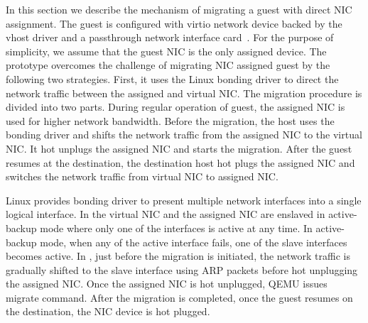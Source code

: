 In this section we describe the mechanism of migrating a guest with 
direct NIC assignment. The guest is configured with virtio network 
device backed by the vhost driver and a passthrough network interface 
card~\cite{zhai:2008}. For the purpose of simplicity, we assume that the 
guest NIC is the only assigned device. The prototype overcomes 
the challenge of migrating NIC assigned guest by the following
two strategies. First, it uses the Linux bonding driver to
direct the network traffic between the assigned and virtual
NIC. The migration procedure is divided into two parts. During regular operation 
of guest, the assigned NIC is used for higher network bandwidth. 
Before the migration, the host uses the bonding driver and shifts the
network traffic from the assigned NIC to the virtual NIC. It
hot unplugs the assigned NIC and starts the migration. After
the guest resumes at the destination, the destination host hot
plugs the assigned NIC and switches the network traffic
from virtual NIC to assigned NIC. 

%

Linux provides bonding driver to present multiple network interfaces
into a single logical interface. In \na the virtual NIC and the assigned NIC 
are enslaved in active-backup mode where only one of the interfaces
is active at any time. In active-backup mode, when any of the active
interface fails, one of the slave interfaces becomes active. In \na,
just before the migration is initiated, the network traffic is gradually 
shifted to the slave interface using ARP packets before hot unplugging
the assigned NIC. Once the assigned NIC is hot unplugged, QEMU issues migrate
command. After the migration is completed, once the guest resumes on the
destination, the NIC device is hot plugged.

